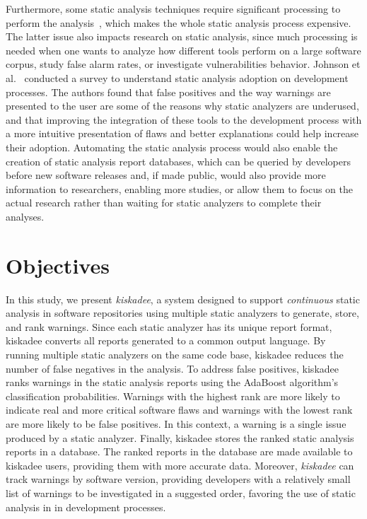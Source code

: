Furthermore, some static analysis techniques require significant processing to
perform the analysis~\cite{pan_bug_2006}, which makes the whole static analysis
process expensive. The latter issue also impacts research on static analysis,
since much processing is needed when one wants to analyze how different tools
perform on a large software corpus, study false alarm rates, or investigate
vulnerabilities behavior. Johnson et al.~\cite{johnson_why_2013} conducted a
survey to understand static analysis adoption on development processes.
The authors found that false positives and the way warnings are presented to the user are
some of the reasons why static analyzers are underused, and that improving the
integration of these tools to the development process with a more intuitive
presentation of flaws and better explanations could help increase their
adoption.  Automating the static analysis process would also enable the
creation of static analysis report databases, which can be queried by
developers before new software releases and, if made public, would also provide
more information to researchers, enabling more studies, or allow them to focus
on the actual research rather than waiting for static analyzers to complete
their analyses.


\section{Objectives}
\label{sec:objectives}

In this study, we present \textit{kiskadee}, a system designed to support
\emph{continuous} static analysis in software repositories using multiple
static analyzers to generate, store, and rank warnings. Since each static
analyzer has its unique report format, kiskadee converts all reports generated to
a common output language. By running multiple static analyzers on the same code
base, kiskadee reduces the number of false negatives in the analysis. To
address false positives, kiskadee ranks warnings in the static analysis reports
using the AdaBoost algorithm's~\cite{freund1999short} classification
probabilities.  Warnings with the highest rank are more likely to indicate real
and more critical software flaws and warnings with the lowest rank are more
likely to be false positives. In this context, a warning is a single issue
produced by a static analyzer. Finally, kiskadee stores the ranked static
analysis reports in a database. The ranked reports in the database are made
available to kiskadee users, providing them with more accurate data. Moreover,
\textit{kiskadee} can track warnings by software version, providing developers
with a relatively small list of warnings to be investigated in a suggested
order, favoring the use of static analysis in in development processes.

